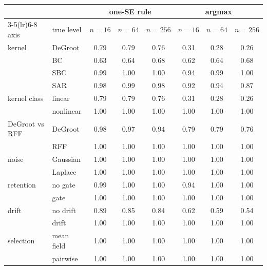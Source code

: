 {\small\setlength{\tabcolsep}{4pt}
\begin{tabular}{llcccccc}
\toprule
 & & \multicolumn{3}{c}{one-SE rule} & \multicolumn{3}{c}{argmax} \\
\cmidrule(lr){3-5}\cmidrule(lr){6-8}
axis & true level & $n{=}16$ & $n{=}64$ & $n{=}256$ & $n{=}16$ & $n{=}64$ & $n{=}256$ \\
\midrule
kernel & DeGroot & 0.79 & 0.79 & 0.76 & 0.31 & 0.28 & 0.26 \\
 & BC & 0.63 & 0.64 & 0.68 & 0.62 & 0.64 & 0.68 \\
 & SBC & 0.99 & 1.00 & 1.00 & 0.94 & 0.99 & 1.00 \\
 & SAR & 0.98 & 0.99 & 0.98 & 0.92 & 0.94 & 0.87 \\
kernel class & linear & 0.79 & 0.79 & 0.76 & 0.31 & 0.28 & 0.26 \\
 & nonlinear & 1.00 & 1.00 & 1.00 & 1.00 & 1.00 & 1.00 \\
DeGroot vs RFF & DeGroot & 0.98 & 0.97 & 0.94 & 0.79 & 0.79 & 0.76 \\
 & RFF & 1.00 & 1.00 & 1.00 & 1.00 & 1.00 & 1.00 \\
noise & Gaussian & 1.00 & 1.00 & 1.00 & 1.00 & 1.00 & 1.00 \\
 & Laplace & 1.00 & 1.00 & 1.00 & 1.00 & 1.00 & 1.00 \\
retention & no gate & 0.99 & 1.00 & 1.00 & 0.94 & 1.00 & 1.00 \\
 & gate & 1.00 & 1.00 & 1.00 & 1.00 & 1.00 & 1.00 \\
drift & no drift & 0.89 & 0.85 & 0.84 & 0.62 & 0.59 & 0.54 \\
 & drift & 1.00 & 1.00 & 1.00 & 1.00 & 1.00 & 1.00 \\
selection & mean field & 1.00 & 1.00 & 1.00 & 1.00 & 1.00 & 1.00 \\
 & pairwise & 1.00 & 1.00 & 1.00 & 1.00 & 1.00 & 1.00 \\
\bottomrule
\end{tabular}}
